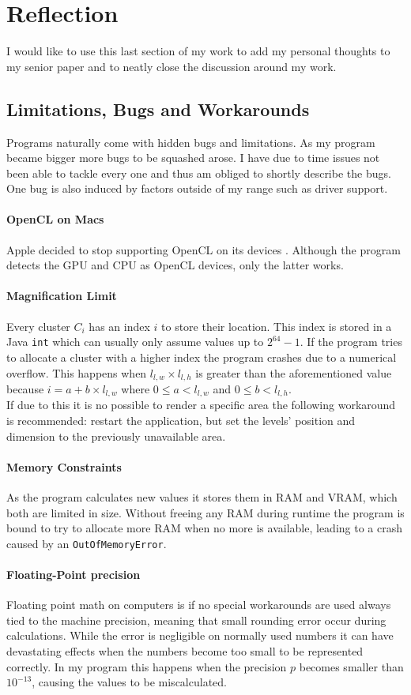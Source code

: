 \documentclass[10pt,a4paper,titlepage]{article}
\begin{document}
	\section{Reflection}
	I would like to use this last section of my work to add my personal thoughts to my senior paper and to neatly close the discussion around my work.
	\subsection{Limitations, Bugs and Workarounds}
	Programs naturally come with hidden bugs and limitations. As my program became bigger more bugs to be squashed arose. I have due to time issues not been able to tackle every one and thus am obliged to shortly describe the bugs. One bug is also induced by factors outside of my range such as driver support.
	\paragraph{OpenCL on Macs}
	Apple decided to stop supporting OpenCL on its devices \cite{appleinsider}. Although the program detects the GPU and CPU as OpenCL devices, only the latter works.
	\paragraph{Magnification Limit}
	Every cluster \(C_i\) has an index \(i\) to store their location. This index is stored in a Java \verb|int| which can usually only assume values up to \(2^{64} - 1\). If the program tries to allocate a cluster with a higher index the program crashes due to a numerical overflow. This happens when \(l_{l,w} \times l_{l,h}\) is greater than the aforementioned value because \(i = a + b \times l_{l,w}\) where \(0 \leq a < l_{l,w}\) and \(0 \leq b < l_{l,h}\).\\
	If due to this it is no possible to render a specific area the following workaround is recommended: restart the application, but set the levels' position and dimension to the previously unavailable area.
	\paragraph{Memory Constraints}\label{sec:memory_problem}
	As the program calculates new values it stores them in RAM and VRAM, which both are limited in size. Without freeing any RAM during runtime the program is bound to try to allocate more RAM when no more is available, leading to a crash caused by an \verb|OutOfMemoryError|.
	\paragraph{Floating-Point precision}
	Floating point math on computers is if no special workarounds are used always tied to the machine precision, meaning that small rounding error occur during calculations. While the error is negligible on normally used numbers it can have devastating effects when the numbers become too small to be represented correctly. In my program this happens when the precision \(p\) becomes smaller than \(10^{-13}\), causing the values to be miscalculated.
\end{document}
